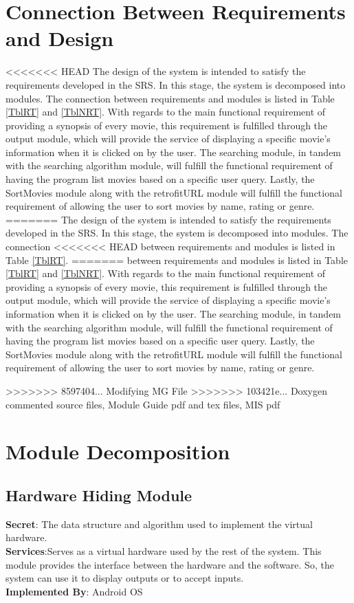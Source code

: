 \documentclass[12pt, titlepage]{article}
\begin{document}
\section{Connection Between Requirements and Design} \label{SecConnection}

<<<<<<< HEAD
The design of the system is intended to satisfy the requirements developed in the SRS. In this stage, the system is decomposed into modules. The connection between requirements and modules is listed in Table \ref{TblRT} and \ref{TblNRT}. With regards to the main functional requirement of providing a synopsis of every movie, this requirement is fulfilled through the output module, which will provide the service of displaying a specific movie's information when it is clicked on by the user. The searching module, in tandem with the searching algorithm module, will fulfill the functional requirement of having the program list movies based on a specific user query. Lastly, the SortMovies module along with the retrofitURL module will fulfill the functional requirement of allowing the user to sort movies by name, rating or genre.
=======
The design of the system is intended to satisfy the requirements developed in
the SRS. In this stage, the system is decomposed into modules. The connection
<<<<<<< HEAD
between requirements and modules is listed in Table \ref{TblRT}.
=======
between requirements and modules is listed in Table \ref{TblRT} and \ref{TblNRT}. With regards to the main functional requirement of providing a synopsis of every movie, this requirement is fulfilled through the output module, which will provide the service of displaying a specific movie's information when it is clicked on by the user. The searching module, in tandem with the searching algorithm module, will fulfill the functional requirement of having the program list movies based on a specific user query. Lastly, the SortMovies module along with the retrofitURL module will fulfill the functional requirement of allowing the user to sort movies by name, rating or genre.

>>>>>>> 8597404... Modifying MG File
>>>>>>> 103421e... Doxygen commented source files, Module Guide pdf and tex files, MIS pdf

\section{Module Decomposition} \label{SecMD}

	\subsection{Hardware Hiding Module}
	\textbf{Secret}: The data structure and algorithm used to implement the virtual hardware.\\
	\textbf{Services}:Serves as a virtual hardware used by the rest of the system. This module provides the interface between the hardware and the software. So, the system can use it to display outputs or to accept inputs. \\
	\textbf{Implemented By}: Android OS
	
\end{document}
